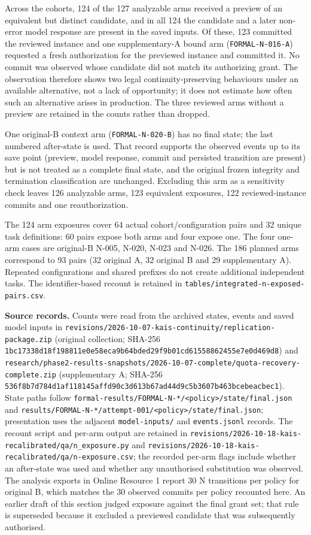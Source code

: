 \documentclass[10pt,a4paper]{article}
\begin{document}
Across the cohorts, 124 of the 127 analyzable arms received a preview of an equivalent but distinct candidate, and in all 124 the candidate and a later non-error model response are present in the saved inputs. Of these, 123 committed the reviewed instance and one supplementary-A bound arm (\texttt{FORMAL-N-016-A}) requested a fresh authorization for the previewed instance and committed it. No commit was observed whose candidate did not match its authorizing grant. The observation therefore shows two legal continuity-preserving behaviours under an available alternative, not a lack of opportunity; it does not estimate how often such an alternative arises in production. The three reviewed arms without a preview are retained in the counts rather than dropped.

One original-B context arm (\texttt{FORMAL-N-020-B}) has no final state; the last numbered after-state is used. That record supports the observed events up to its save point (preview, model response, commit and persisted transition are present) but is not treated as a complete final state, and the original frozen integrity and termination classification are unchanged. Excluding this arm as a sensitivity check leaves 126 analyzable arms, 123 equivalent exposures, 122 reviewed-instance commits and one reauthorization.

The 124 arm exposures cover 64 actual cohort/configuration pairs and 32 unique task definitions: 60 pairs expose both arms and four expose one. The four one-arm cases are original-B N-005, N-020, N-023 and N-026. The 186 planned arms correspond to 93 pairs (32 original A, 32 original B and 29 supplementary A). Repeated configurations and shared prefixes do not create additional independent tasks. The identifier-based recount is retained in \texttt{tables/integrated-n-exposed-pairs.csv}.

\textbf{Source records.} Counts were read from the archived states, events and saved model inputs in \nolinkurl{revisions/2026-10-07-kais-continuity/replication-package.zip} (original collection; SHA-256 \nolinkurl{1bc17338d18f198811e0e58eca9b64bded29f9b01cd61558862455e7e0d469d8}) and \nolinkurl{research/phase2-results-snapshots/2026-10-07-complete/quota-recovery-complete.zip} (supplementary A; SHA-256 \nolinkurl{536f8b7d784d1af118145affd90c3d613b67ad44d9c5b3607b463bcebeacbec1}). State paths follow \nolinkurl{formal-results/FORMAL-N-*/<policy>/state/final.json} and \nolinkurl{results/FORMAL-N-*/attempt-001/<policy>/state/final.json}; presentation uses the adjacent \nolinkurl{model-inputs/} and \nolinkurl{events.jsonl} records. The recount script and per-arm output are retained in \nolinkurl{revisions/2026-10-18-kais-recalibrated/qa/n_exposure.py} and \nolinkurl{revisions/2026-10-18-kais-recalibrated/qa/n-exposure.csv}; the recorded per-arm flags include whether an after-state was used and whether any unauthorised substitution was observed. The analysis exports in Online Resource 1 report 30 N transitions per policy for original B, which matches the 30 observed commits per policy recounted here. An earlier draft of this section judged exposure against the final grant set; that rule is superseded because it excluded a previewed candidate that was subsequently authorised.
\end{document}

